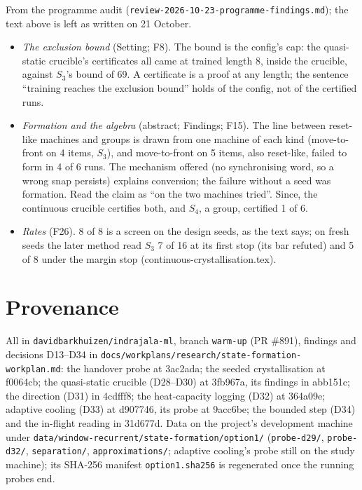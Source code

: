 \documentclass[11pt]{article}
\begin{document}
From the programme audit (\texttt{review-2026-10-23-programme-findings.md}); the text above is left
as written on 21 October.
\begin{itemize}
  \item \emph{The exclusion bound} (Setting; F8). The bound is the config's cap: the quasi-static
  crucible's certificates all came at trained length 8, inside the crucible, against $S_3$'s bound of
  69. A certificate is a proof at any length; the sentence ``training reaches the exclusion bound''
  holds of the config, not of the certified runs.
  \item \emph{Formation and the algebra} (abstract; Findings; F15). The line between reset-like
  machines and groups is drawn from one machine of each kind (move-to-front on 4 items, $S_3$), and
  move-to-front on 5 items, also reset-like, failed to form in 4 of 6 runs. The mechanism offered (no
  synchronising word, so a wrong snap persists) explains conversion; the failure without a seed was
  formation. Read the claim as ``on the two machines tried''. Since, the continuous crucible
  certifies both, and $S_4$, a group, certified 1 of 6.
  \item \emph{Rates} (F26). 8 of 8 is a screen on the design seeds, as the text says; on fresh seeds
  the later method read $S_3$ 7 of 16 at its first stop (its bar refuted) and 5 of 8 under the
  margin stop (continuous-crystallisation.tex).
\end{itemize}

\section{Provenance}
\label{sec:provenance}

All in \texttt{davidbarkhuizen/indrajala-ml}, branch \texttt{warm-up} (PR \#891), findings and
decisions D13--D34 in \texttt{docs/workplans/research/state-formation-workplan.md}: the handover probe at 3ac2ada; the
seeded crystallisation at f0064cb; the quasi-static crucible (D28--D30) at 3fb967a, its findings in
abb151c; the direction (D31) in 4cdfff8; the heat-capacity logging (D32) at 364a09e; adaptive
cooling (D33) at d907746, its probe at 9acc6be; the bounded step (D34) and the in-flight reading in
31d677d. Data on the project's development machine under
\texttt{data/window-recurrent/state-formation/option1/} (\texttt{probe-d29/}, \texttt{probe-d32/},
\texttt{separation/}, \texttt{approximations/}; adaptive cooling's probe still on the study machine);
its SHA-256 manifest \texttt{option1.sha256} is regenerated once the running probes end.



\end{document}
